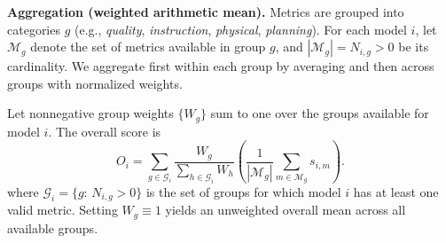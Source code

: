 
\textbf{Aggregation (weighted arithmetic mean).}
Metrics are grouped into categories $g$ (e.g., \emph{quality}, \emph{instruction}, \emph{physical}, \emph{planning}).
For each model $i$, let $\mathcal{M}_g$ denote the set of metrics available in group $g$, and
$|\mathcal{M}_g|=N_{i,g}>0$ be its cardinality.
We aggregate first within each group by averaging and then across groups with normalized weights.

Let nonnegative group weights $\{W_g\}$ sum to one over the groups available for model $i$.
The overall score is
\[
O_i=\sum_{g\in\mathcal{G}_i}
\frac{W_g}{\sum_{h\in\mathcal{G}_i} W_h}
\left(
    \frac{1}{|\mathcal{M}_g|}
    \sum_{m\in\mathcal{M}_g} s_{i,m}
\right).
\]
where $\mathcal{G}_i=\{g:\,N_{i,g}>0\}$ is the set of groups for which model $i$ has at least one valid metric.
Setting $W_g\equiv 1$ yields an unweighted overall mean across all available groups.

